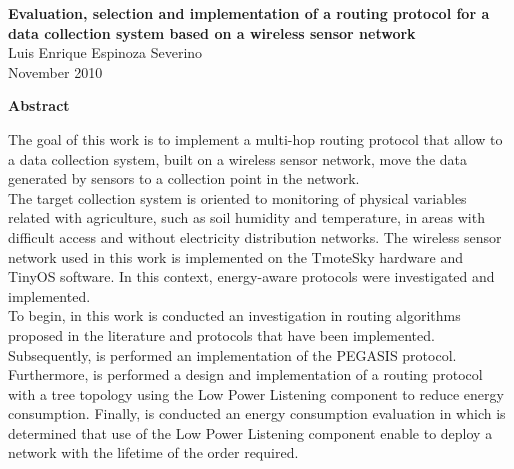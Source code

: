 \newpage
\thispagestyle{empty}
\begin{center}
 \Large \textbf{Evaluation, selection and implementation of a routing protocol for a data collection system based on a wireless sensor network}\\

\normalsize Luis Enrique Espinoza Severino \\
\normalsize November 2010

\Large \textbf{Abstract}

\end{center}
\normalsize
The goal of this work is to implement a multi-hop routing protocol that allow to a data collection system, built on a wireless sensor network, move the data generated by sensors to a collection point in the network.\\

The target collection system is oriented to monitoring of physical variables related with agriculture, such as soil humidity and temperature, in areas with difficult access and without electricity distribution networks. The wireless sensor network used in this work is implemented on the TmoteSky hardware and TinyOS software. In this context, energy-aware protocols were investigated and implemented.\\

To begin, in this work is conducted an investigation in routing algorithms proposed in the literature and protocols that have been implemented. Subsequently, is performed an implementation of the PEGASIS protocol. Furthermore, is performed a design and implementation of a routing protocol with a tree topology using the Low Power Listening component to reduce energy consumption. Finally, is conducted an energy consumption evaluation in which is determined that use of the Low Power Listening component enable to deploy a network with the lifetime of the order required.


